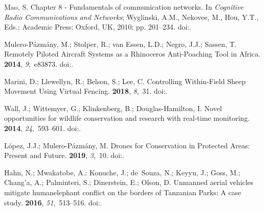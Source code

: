 \documentclass[jsan,article,accept,moreauthors,pdftex]{Definitions/mdpi}
\begin{document}
\begin{thebibliography}{999}
Mao, S.
\newblock Chapter 8 - Fundamentals of communication networks. In {\em Cognitive
  Radio Communications and Networks}; Wyglinski, A.M., Nekovee, M., Hou, Y.T.,
  Eds.; Academic Press: Oxford, UK,  2010; pp. 201--234.
\newblock
  doi:{\href{https://doi.org/https://doi.org/10.1016/B978-0-12-374715-0.00008-3}{}}.

Mulero-P{\'{a}}zm{\'{a}}ny, M.; Stolper, R.; van Essen, L.D.; Negro, J.J.;
  Sassen, T.
\newblock Remotely Piloted Aircraft Systems as a Rhinoceros Anti-Poaching Tool
  in Africa.
 {\bf 2014}, {\em 9},~e83873.
\newblock
  doi:{\href{https://doi.org/10.1371/journal.pone.0083873}{}}.

Marini, D.; Llewellyn, R.; Belson, S.; Lee, C.
\newblock Controlling Within-Field Sheep Movement Using Virtual Fencing.
 {\bf 2018}, {\em 8},~31.
\newblock
  doi:{\href{https://doi.org/10.3390/ani8030031}{}}.

Wall, J.; Wittemyer, G.; Klinkenberg, B.; Douglas-Hamilton, I.
\newblock Novel opportunities for wildlife conservation and research with
  real-time monitoring.
 {\bf 2014}, {\em 24},~593--601.
\newblock
  doi:{\href{https://doi.org/10.1890/13-1971.1}{}}.

L{\'{o}}pez, J.J.; Mulero-P{\'{a}}zm{\'{a}}ny, M.
\newblock Drones for Conservation in Protected Areas: Present and Future.
 {\bf 2019}, {\em 3},~10.
\newblock
  doi:{\href{https://doi.org/10.3390/drones3010010}{}}.

Hahn, N.; Mwakatobe, A.; Konuche, J.; de~Souza, N.; Keyyu, J.; Goss, M.;
  Chang'a, A.; Palminteri, S.; Dinerstein, E.; Olson, D.
\newblock Unmanned aerial vehicles mitigate human{\textendash}elephant conflict
  on the borders of Tanzanian Parks: A case study.
 {\bf 2016}, {\em 51},~513--516.
\newblock
  doi:{\href{https://doi.org/10.1017/s0030605316000946}{}}.


\end{thebibliography}
\end{document}

